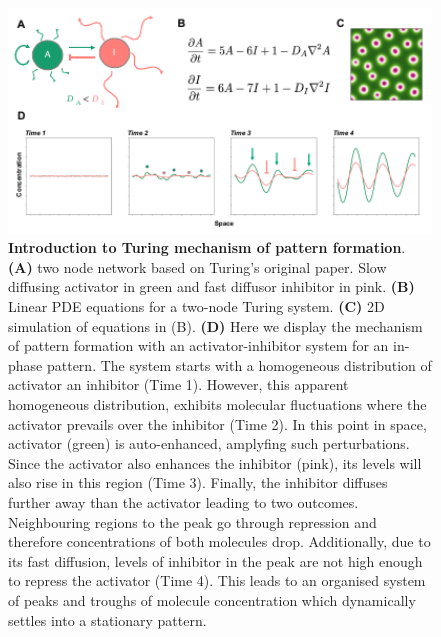 \begin{figure}[h!]
    \centering
    \includegraphics[width=1\textwidth]{chapters/Introduction/intro_to_Turing_patterns}
    \caption{\textbf{Introduction to Turing mechanism of pattern formation}. \textbf{(A)} two node network based on Turing's original paper. Slow diffusing activator in green and fast diffusor inhibitor in pink. \textbf{(B)} Linear PDE equations for a two-node Turing system. \textbf{(C)} 2D simulation of equations in (B). \textbf{(D)} Here we display the mechanism of pattern formation with an activator-inhibitor system for an in-phase pattern. The system starts with a homogeneous distribution of activator an inhibitor (Time 1). However, this apparent homogeneous distribution, exhibits molecular fluctuations where the activator prevails over the inhibitor (Time 2). In this point in space, activator (green) is auto-enhanced, amplyfing such perturbations. Since the activator also enhances the inhibitor (pink), its levels will also rise in this region (Time 3). Finally, the inhibitor diffuses further away than the activator leading to two outcomes. Neighbouring regions to the peak go through repression and therefore concentrations of both molecules drop. Additionally, due to its fast diffusion, levels of inhibitor in the peak are not high enough to repress the activator  (Time 4). This leads to an organised system of peaks and troughs of molecule concentration which dynamically settles into a stationary pattern.}
    \label{fig:intro_to_Turing_patterns}
\end{figure}


